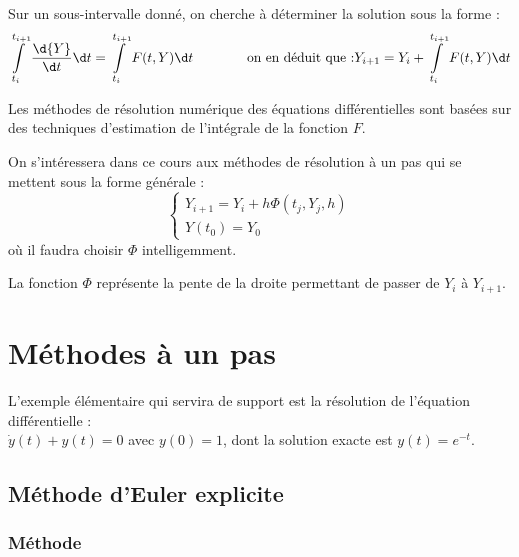 \documentclass[10pt]{article}
\begin{document}
Sur un sous-intervalle donné, on cherche à déterminer la solution sous la forme :\[\int\limits_{t_i}^{t_{i+1}} \dfrac{\d  {Y}}{\d t} \d t = \int\limits_{t_i}^{t_{i+1}}   {F}(t,  {Y})\d t \qquad\qquad\textrm{on en déduit que :}  {Y}_{i+1} =   {Y}_{i} +  \int\limits_{t_i}^{t_{i+1}}   {F}(t,  {Y})\d t \]



Les méthodes de résolution numérique des équations différentielles sont basées sur des techniques d'estimation de l'intégrale de la fonction $  {F}$.

On s'intéressera dans ce cours aux méthodes de résolution à un pas qui se mettent sous la forme générale :
\[ \displaystyle \left\{\begin{matrix}
  {Y}_{i+1} =   {Y}_{i} +  h  {\Phi}( t_j,  {Y}_j,h)\\
  {Y}(t_0)=  {Y_0}
\end{matrix}\right. \]
où il faudra choisir $  {\Phi}$ intelligemment.

La fonction $  {\Phi}$ représente la pente de la droite permettant de passer de $  {Y}_{i}$ à $  {Y}_{i+1}$.




\section{Méthodes à un pas}
L'exemple élémentaire qui servira de support est la résolution de l'équation différentielle :\\ $\dot y(t) + y(t) = 0$ avec $y(0)=1$, dont la solution exacte est $y(t)=e^{-t}$.

\subsection{Méthode d'Euler explicite}
\subsubsection{Méthode}

\end{document}
